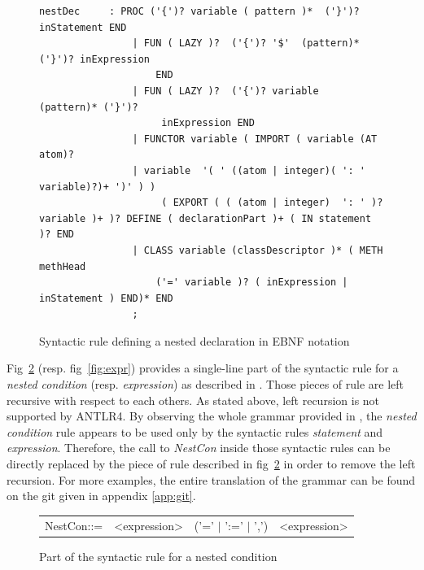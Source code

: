 \documentclass[11pt,a4paper,twoside,openright]{report}
\begin{document}
\begin{figure}[!ht]
  \begin{lstlisting}
nestDec 	: PROC ('{')? variable ( pattern )*  ('}')? inStatement END
				| FUN ( LAZY )?  ('{')? '$'  (pattern)* ('}')? inExpression 
					END
				| FUN ( LAZY )?  ('{')? variable  (pattern)* ('}')?
					 inExpression END
				| FUNCTOR variable ( IMPORT ( variable (AT atom)?
				| variable  '( ' ((atom | integer)( ': ' variable)?)+ ')' ) )
					 ( EXPORT ( ( (atom | integer)  ': ' )? variable )+ )? DEFINE ( declarationPart )+ ( IN statement )? END
				| CLASS variable (classDescriptor )* ( METH methHead 
					('=' variable )? ( inExpression | inStatement ) END)* END
				;
  \end{lstlisting}
  \caption{Syntactic rule defining a nested declaration in EBNF notation}
  \label{fig:oz_gram}
\end{figure}

Fig~\ref{fig:nestcon} (resp. fig~\ref{fig:expr}) provides a single-line part of 
the syntactic rule for a \textit{nested condition} (resp. \textit{expression}) 
as described in \cite{vanroy_haridi_oz}. Those pieces of rule are left 
recursive with respect to each others. As stated above, left recursion is not 
supported by \textsc{ANTLR4}. By observing the whole grammar provided in 
\cite{vanroy_haridi_oz}, the \textit{nested condition} rule appears to be used 
only by the syntactic rules \textit{statement} and \textit{expression}. 
Therefore, the call to \textit{NestCon} inside those syntactic rules can be 
directly replaced by the piece of rule described in fig~\ref{fig:nestcon} in 
order to remove the left recursion. For more examples, the entire translation 
of 
the grammar can be found on the git given in appendix \ref{app:git}.\\

\begin{figure}[!ht]
  \centering
  \begin{tabular}{cccc}
    NestCon::= & \textless expression\textgreater &('=' $\vert$ ':=' $\vert$ 
    ',')&\textless expression\textgreater
  \end{tabular}
  \caption{Part of the syntactic rule for a nested condition} 
  \label{fig:nestcon}
\end{figure}
\end{document}
